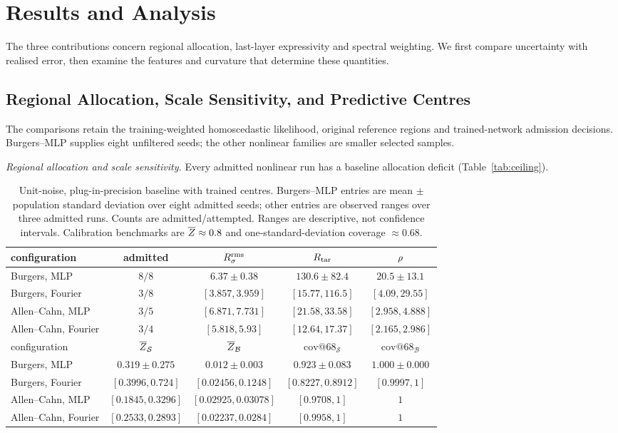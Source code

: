 \section{Results and Analysis}\label{sec:results}

The three contributions concern regional allocation, last-layer expressivity and spectral
weighting. We first compare uncertainty with realised error, then examine the features and
curvature that determine these quantities.

\subsection{Regional Allocation, Scale Sensitivity, and Predictive Centres}\label{sec:ceiling}

The comparisons retain the training-weighted homoscedastic likelihood, original
reference regions and trained-network admission decisions. Burgers--MLP supplies
eight unfiltered seeds; the other nonlinear families are smaller selected samples.

\emph{Regional allocation and scale sensitivity.}
Every admitted nonlinear run has a baseline allocation deficit (Table~\ref{tab:ceiling}).

\begin{table}[t]
\centering\small


\begin{tabular}{@{}lcccc@{}}
\toprule
configuration & admitted & $R_{\sigma}^{\mathrm{rms}}$ & $R_{\mathrm{tar}}$ & $\rho$ \\
\midrule
Burgers, MLP & $8/8$ & $6.37\pm0.38$ & $130.6\pm82.4$ & $20.5\pm13.1$ \\
Burgers, Fourier & $3/8$ & $[3.857,3.959]$ & $[15.77,116.5]$ & $[4.09,29.55]$ \\
Allen--Cahn, MLP & $3/5$ & $[6.871,7.731]$ & $[21.58,33.58]$ & $[2.958,4.888]$ \\
Allen--Cahn, Fourier & $3/4$ & $[5.818,5.93]$ & $[12.64,17.37]$ & $[2.165,2.986]$ \\
\midrule
configuration & $\overline{Z}_{\mathcal S}$ & $\overline{Z}_{\mathcal B}$
 & $\mathrm{cov}@68_{\mathcal S}$ & $\mathrm{cov}@68_{\mathcal B}$ \\
\midrule
Burgers, MLP & $0.319\pm0.275$ & $0.012\pm0.003$ & $0.923\pm0.083$ & $1.000\pm0.000$ \\
Burgers, Fourier & $[0.3996,0.724]$ & $[0.02456,0.1248]$ & $[0.8227,0.8912]$ & $[0.9997,1]$ \\
Allen--Cahn, MLP & $[0.1845,0.3296]$ & $[0.02925,0.03078]$ & $[0.9708,1]$ & $1$ \\
Allen--Cahn, Fourier & $[0.2533,0.2893]$ & $[0.02237,0.0284]$ & $[0.9958,1]$ & $1$ \\
\bottomrule
\end{tabular}
\caption{Unit-noise, plug-in-precision baseline with trained centres. Burgers--MLP entries
are mean $\pm$ population standard deviation over eight admitted seeds; other entries are
observed ranges over three admitted runs. Counts are admitted/attempted.
Ranges are descriptive, not confidence intervals. Calibration benchmarks are
$\overline{Z}\approx0.8$ and one-standard-deviation coverage $\approx0.68$.}
\label{tab:ceiling}\label{tab:absolute}
\end{table}

